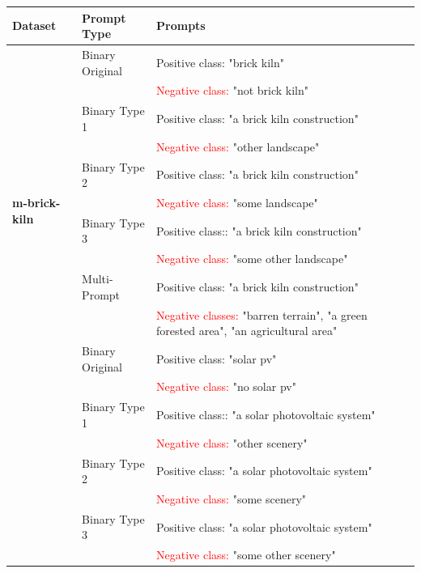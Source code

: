 \documentclass[a4paper, twoside, english]{sapthesis} %
\begin{document}
\begin{table}[H]
\centering
\footnotesize
\renewcommand{\arraystretch}{1.2}
\begin{tabular}{llp{8cm}}
\toprule
\textbf{Dataset} & \textbf{Prompt Type} & \textbf{Prompts} \\
\midrule
\multirow{11}{*}{\textbf{m-brick-kiln}} 
  & Binary Original & \textcolor{customgreen}{Positive class:} "brick kiln" \\
  & & \textcolor{red}{Negative class:} "not brick kiln" \\
  \cmidrule(lr){2-3}
  & Binary Type 1 & \textcolor{customgreen}{Positive class:} "a brick kiln construction" \\
  & & \textcolor{red}{Negative class:} "other landscape" \\
  \cmidrule(lr){2-3}
  & Binary Type 2 & \textcolor{customgreen}{Positive class:} "a brick kiln construction" \\
  & & \textcolor{red}{Negative class:} "some landscape" \\
  \cmidrule(lr){2-3}
  & Binary Type 3 & \textcolor{customgreen}{Positive class:}: "a brick kiln construction" \\
  & & \textcolor{red}{Negative class:} "some other landscape" \\
  \cmidrule(lr){2-3}
  & Multi-Prompt & \textcolor{customgreen}{Positive class:} "a brick kiln construction" \\
  & & \textcolor{red}{Negative classes:} "barren terrain", "a green forested area", "an agricultural area" \\
\midrule
\multirow{11}{*}{\textbf{m-pv4ger}} 
  & Binary Original & \textcolor{customgreen}{Positive class:} "solar pv" \\
  & & \textcolor{red}{Negative class:} "no solar pv" \\
  \cmidrule(lr){2-3}
  & Binary Type 1 & \textcolor{customgreen}{Positive class:}: "a solar photovoltaic system" \\
  & & \textcolor{red}{Negative class:} "other scenery" \\
  \cmidrule(lr){2-3}
  & Binary Type 2 & \textcolor{customgreen}{Positive class:} "a solar photovoltaic system" \\
  & & \textcolor{red}{Negative class:} "some scenery" \\
  \cmidrule(lr){2-3}
  & Binary Type 3 & \textcolor{customgreen}{Positive class:} "a solar photovoltaic system" \\
  & & \textcolor{red}{Negative class:} "some other scenery" \\

\end{tabular}
\end{table}
\end{document}
